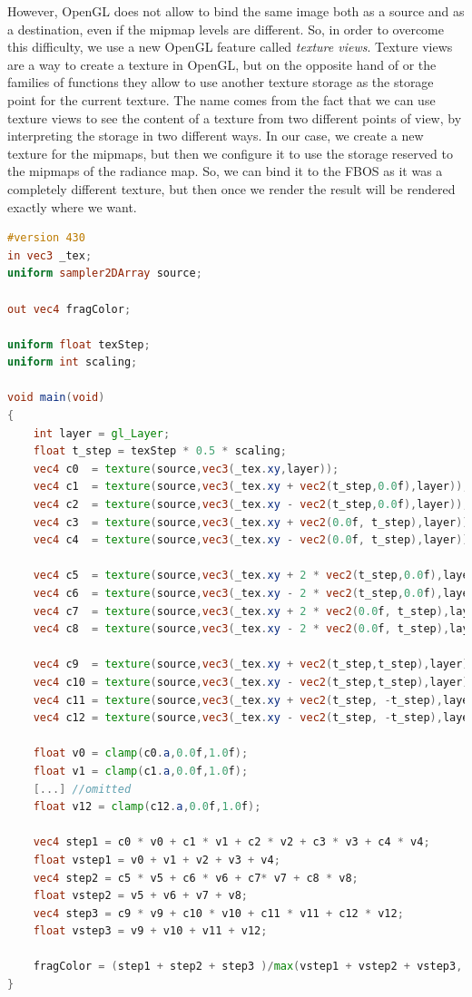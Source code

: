 However, OpenGL does not allow to bind the same image both as a source and as a destination, even if the mipmap levels are different. So, in order to overcome this difficulty, we use a new OpenGL feature called \emph{texture views}. Texture views are a way to create a texture in OpenGL, but on the opposite hand of  or the  families of functions they allow to use another texture storage as the storage point for the current texture. The name comes from the fact that we can use texture views to see the content of a texture from two different points of view, by interpreting the storage in two different ways. In our case, we create a new texture for the mipmaps, but then we configure it to use the storage reserved to the mipmaps of the radiance map. So, we can bind it to the FBOS as it was a completely different texture, but then once we render the result will be rendered exactly where we want. %

\begin{lstlisting}[language=GLSL,label=lst:shaderimageprocessing,caption={Custom mipmap filtering on GPU. \gl{_tex} are the texture coordinates on the screen aligned quad.}]
#version 430
in vec3 _tex;
uniform sampler2DArray source;

out vec4 fragColor;

uniform float texStep;
uniform int scaling;

void main(void)
{
	int layer = gl_Layer;
	float t_step = texStep * 0.5 * scaling;
	vec4 c0  = texture(source,vec3(_tex.xy,layer));
	vec4 c1  = texture(source,vec3(_tex.xy + vec2(t_step,0.0f),layer));
	vec4 c2  = texture(source,vec3(_tex.xy - vec2(t_step,0.0f),layer));
	vec4 c3  = texture(source,vec3(_tex.xy + vec2(0.0f, t_step),layer));
	vec4 c4  = texture(source,vec3(_tex.xy - vec2(0.0f, t_step),layer));

	vec4 c5  = texture(source,vec3(_tex.xy + 2 * vec2(t_step,0.0f),layer));
	vec4 c6  = texture(source,vec3(_tex.xy - 2 * vec2(t_step,0.0f),layer));
	vec4 c7  = texture(source,vec3(_tex.xy + 2 * vec2(0.0f, t_step),layer));
	vec4 c8  = texture(source,vec3(_tex.xy - 2 * vec2(0.0f, t_step),layer));

	vec4 c9  = texture(source,vec3(_tex.xy + vec2(t_step,t_step),layer));
	vec4 c10 = texture(source,vec3(_tex.xy - vec2(t_step,t_step),layer));
	vec4 c11 = texture(source,vec3(_tex.xy + vec2(t_step, -t_step),layer));
	vec4 c12 = texture(source,vec3(_tex.xy - vec2(t_step, -t_step),layer));

	float v0 = clamp(c0.a,0.0f,1.0f);
	float v1 = clamp(c1.a,0.0f,1.0f);
	[...] //omitted
	float v12 = clamp(c12.a,0.0f,1.0f);

	vec4 step1 = c0 * v0 + c1 * v1 + c2 * v2 + c3 * v3 + c4 * v4;
	float vstep1 = v0 + v1 + v2 + v3 + v4;
	vec4 step2 = c5 * v5 + c6 * v6 + c7* v7 + c8 * v8;
	float vstep2 = v5 + v6 + v7 + v8;
	vec4 step3 = c9 * v9 + c10 * v10 + c11 * v11 + c12 * v12;
	float vstep3 = v9 + v10 + v11 + v12;

	fragColor = (step1 + step2 + step3 )/max(vstep1 + vstep2 + vstep3, 1.0f);
}
\end{lstlisting}

